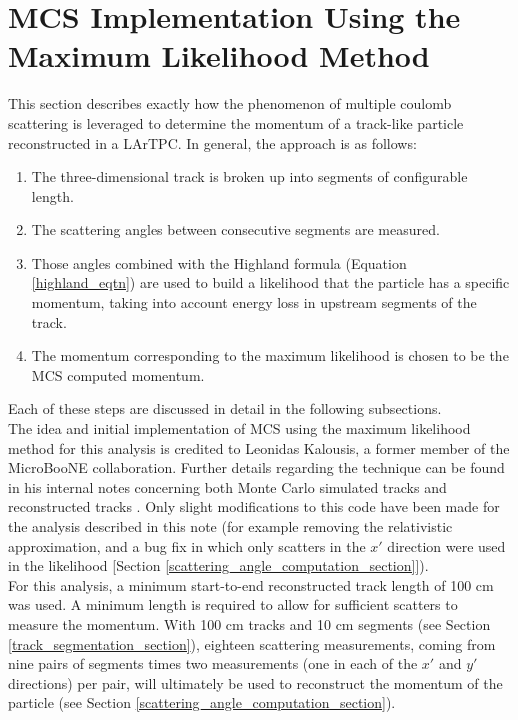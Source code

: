 \section{MCS Implementation Using the Maximum Likelihood Method}\label{MCS_technique_section}

This section describes exactly how the phenomenon of multiple coulomb scattering is leveraged to determine the momentum of a track-like particle reconstructed in a LArTPC. In general, the approach is as follows:
\begin{enumerate}
\item The three-dimensional track is broken up into segments of configurable length.
\item The scattering angles between consecutive segments are measured.
\item Those angles combined with the Highland formula (Equation \ref{highland_eqtn}) are used to build a likelihood that the particle has a specific momentum, taking into account energy loss in upstream segments of the track.
\item The momentum corresponding to the maximum likelihood is chosen to be the MCS computed momentum.
\end{enumerate}
Each of these steps are discussed in detail in the following subsections.\\

The idea and initial implementation of MCS using the maximum likelihood method for this analysis is credited to Leonidas Kalousis, a former member of the MicroBooNE collaboration. Further details regarding the technique can be found in his internal notes concerning both Monte Carlo simulated tracks \cite{leonidas1} and reconstructed tracks \cite{leonidas2}. Only slight modifications to this code have been made for the analysis described in this note (for example removing the relativistic approximation, and a bug fix in which only scatters in the $x'$ direction were used in the likelihood [Section \ref{scattering_angle_computation_section}]).\\

For this analysis, a minimum start-to-end reconstructed track length of 100 cm was used. A minimum length is required to allow for sufficient scatters to measure the momentum. With 100 cm tracks and 10 cm segments (see Section \ref{track_segmentation_section}), eighteen scattering measurements, coming from nine pairs of segments times two measurements (one in each of the $x'$ and $y'$ directions) per pair, will ultimately be used to reconstruct the momentum of the particle (see Section \ref{scattering_angle_computation_section}).

